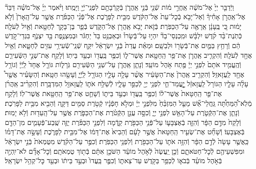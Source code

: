 \documentclass[twoside, openany, parskip=half, 11pt]{book}
\begin{document}
\begin{footnotesize}
\begin{multicols}{2}
\\
וַיְֿדַבֵּ֤ר יְיָ֙ אֶל־מֹשֶׁ֔ה אַֽחֲרֵ֣י מ֔וֹת שְֿׁנֵ֖י בְּֿנֵ֣י אַֽהֲרֹ֑ן בְּֿקָרְֿבָתָ֥ם לִפְנֵֽי־יְֿיָ֖ וַיָּמֻֽתוּ׃ וַיֹּ֨אמֶר יְיָ֜ אֶל־מֹשֶׁ֗ה דַּבֵּר֘ אֶל־אַֽהֲרֹ֣ן אָחִ֒יךָ֒ וְֿאַל־יָבֹ֤א בְֿכׇל־עֵת֙ אֶל־הַקֹּ֔דֶשׁ מִבֵּ֖ית לַפָּרֹ֑כֶת אֶל־פְּֿנֵ֨י הַכַּפֹּ֜רֶת אֲשֶׁ֤ר עַל־הָֽאָרֹן֙ וְֿלֹ֣א יָמ֔וּת כִּ֚י בֶּֽעָנָ֔ן אֵֽרָאֶ֖ה עַל־הַכַּפֹּֽרֶת׃ בְּֿזֹ֛את יָבֹ֥א אַֽהֲרֹ֖ן אֶל־הַקֹּ֑דֶשׁ בְּֿפַ֧ר בֶּן־בָּקָ֛ר לְֿחַטָּ֖את וְֿאַ֥יִל לְֿעֹלָֽה׃ כְּֿתֹֽנֶת־בַּ֨ד קֹ֜דֶשׁ יִלְבָּ֗שׁ וּמִֽכְנְסֵי־בַד֘ יִהְי֣וּ עַל־בְּֿשָׂרוֹ֒ וּבְאַבְנֵ֥ט בַּד֙ יַחְגֹּ֔ר וּבְמִצְנֶ֥פֶת בַּ֖ד יִצְנֹ֑ף בִּגְדֵי־קֹ֣דֶשׁ הֵ֔ם וְֿרָחַ֥ץ בַּמַּ֛יִם אֶת־בְּֿשָׂר֖וֹ וּלְבֵשָֽׁם׃ וּמֵאֵ֗ת עֲדַת֙ בְּֿנֵ֣י יִשְׂרָאֵ֔ל יִקַּ֛ח שְֿׁנֵֽי־שְֿׂעִירֵ֥י עִזִּ֖ים לְֿחַטָּ֑את וְֿאַ֥יִל אֶחָ֖ד לְֿעֹלָֽה׃ וְֿהִקְרִ֧יב אַֽהֲרֹ֛ן אֶת־פַּ֥ר הַֽחַטָּ֖את אֲשֶׁר־ל֑וֹ וְֿכִפֶּ֥ר בַּֽעֲד֖וֹ וּבְעַ֥ד בֵּיתֽוֹ׃  וְֿלָקַ֖ח אֶת־שְׁנֵ֣י הַשְּֿׂעִירִ֑ם וְֿהֶֽעֱמִ֤יד אֹתָם֙ לִפְנֵ֣י יְיָ֔ פֶּ֖תַח אֹ֥הֶל מוֹעֵֽד׃ וְֿנָתַ֧ן אַֽהֲרֹ֛ן עַל־שְׁנֵ֥י הַשְּֿׂעִירִ֖ם גֹּֽרָל֑וֹת גּוֹרָ֤ל אֶחָד֙ לַֽיְֿיָ֔ וְֿגוֹרָ֥ל אֶחָ֖ד לַֽעֲזָאזֵֽל׃ וְֿהִקְרִ֤יב אַֽהֲרֹן֙ אֶת־הַשָּׂעִ֔יר אֲשֶׁ֨ר עָלָ֥ה עָלָ֛יו הַגּוֹרָ֖ל לַֽיְֿיָ֑ וְֿעָשָׂ֖הוּ חַטָּֽאת׃ וְֿהַשָּׂעִ֗יר אֲשֶׁ֖ר֩ עָלָ֨ה עָלָ֤יו הַגּוֹרָל֙ לַֽעֲזָאזֵ֔ל יׇׇׇׇׇׇׇׇׇׇָֽעֳמַד־חַ֛י לִפְנֵ֥י יְיָ֖ לְֿכַפֵּ֣ר עָלָ֑יו לְֿשַׁלַּ֥ח אֹת֛וֹ לַֽעֲזָאזֵ֖ל הַמִּדְבָּֽרָה׃ וְֿהִקְרִ֨יב אַֽהֲרֹ֜ן אֶת־פַּ֤ר הַֽחַטָּאת֙ אֲשֶׁר־ל֔וֹ וְֿכִפֶּ֥ר בַּֽעֲד֖וֹ וּבְעַ֣ד בֵּית֑וֹ וְֿשָׁחַ֛ט אֶת־פַּ֥ר הַֽחַטָּ֖את אֲשֶׁר־לֽוֹ׃  וְֿלָקַ֣ח מְֿלֹֽא־הַ֠מַּחְתָּ֠ה גַּֽחֲלֵי־אֵ֞שׁ מֵעַ֤ל הַמִּזְבֵּ֨חַ֙ מִלִּפְנֵ֣י יְיָ֔ וּמְלֹ֣א חָפְֿנָ֔יו קְֿטֹ֥רֶת סַמִּ֖ים דַּקָּ֑ה וְֿהֵבִ֖יא מִבֵּ֥ית לַפָּרֹֽכֶת׃ וְֿנָתַ֧ן אֶת־הַקְּֿטֹ֛רֶת עַל־הָאֵ֖שׁ לִפְנֵ֣י יְיָ֑ וְֿכִסָּ֣ה עֲנַ֣ן הַקְּֿטֹ֗רֶת אֶת־הַכַּפֹּ֛רֶת אֲשֶׁ֥ר עַל־הָֽעֵד֖וּת וְֿלֹ֥א יָמֽוּת׃ וְֿלָקַח֙ מִדַּ֣ם הַפָּ֔ר וְֿהִזָּ֧ה בְֿאֶצְבָּע֛וֹ עַל־פְּֿנֵ֥י הַכַּפֹּ֖רֶת קֵ֑דְֿמָה וְֿלִפְנֵ֣י הַכַּפֹּ֗רֶת יַזֶּ֧ה שֶֽׁבַע־פְּֿעָמִ֛ים מִן־הַדָּ֖ם בְּֿאֶצְבָּעֽוֹ׃ וְֿשָׁחַ֞ט אֶת־שְׂעִ֤יר הַֽחַטָּאת֙ אֲשֶׁ֣ר לָעָ֔ם וְֿהֵבִיא֙ אֶת־דָּמ֔וֹ אֶל־מִבֵּ֖ית לַפָּרֹ֑כֶת וְֿעָשָׂ֣ה אֶת־דָּמ֗וֹ כַּֽאֲשֶׁ֤ר עָשָׂה֙ לְֿדַ֣ם הַפָּ֔ר וְֿהִזָּ֥ה אֹת֛וֹ עַל־הַכַּפֹּ֖רֶת וְֿלִפְנֵ֥י הַכַּפֹּֽרֶת׃ וְֿכִפֶּ֣ר עַל־הַקֹּ֗דֶשׁ מִטֻּמְאֹת֙ בְּֿנֵ֣י יִשְׂרָאֵ֔ל וּמִפִּשְׁעֵיהֶ֖ם לְֿכׇל־חַטֹּאתָ֑ם וְֿכֵ֤ן יַֽעֲשֶׂה֙ לְֿאֹ֣הֶל מוֹעֵ֔ד הַשֹּׁכֵ֣ן אִתָּ֔ם בְּֿת֖וֹךְ טֻמְאֹתָֽם׃ וְֿכׇל־אָדָ֞ם לֹא־יִֽהְיֶ֣ה בְּֿאֹ֣הֶל מוֹעֵ֗ד בְּֿבֹא֛וֹ לְֿכַפֵּ֥ר בַּקֹּ֖דֶשׁ עַד־צֵאת֑וֹ וְֿכִפֶּ֤ר בַּֽעֲדוֹ֙ וּבְעַ֣ד בֵּית֔וֹ וּבְעַ֖ד כׇּל־קְהַ֥ל יִשְׂרָאֵֽל׃


\end{multicols}
\end{footnotesize}
\end{document}
